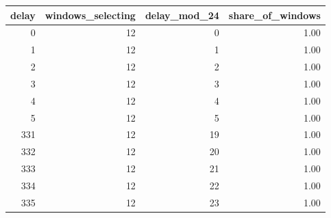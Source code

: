 \begin{tabular}{rrrr}
\toprule
delay & windows\_selecting & delay\_mod\_24 & share\_of\_windows \\
\midrule
0 & 12 & 0 & 1.00 \\
1 & 12 & 1 & 1.00 \\
2 & 12 & 2 & 1.00 \\
3 & 12 & 3 & 1.00 \\
4 & 12 & 4 & 1.00 \\
5 & 12 & 5 & 1.00 \\
331 & 12 & 19 & 1.00 \\
332 & 12 & 20 & 1.00 \\
333 & 12 & 21 & 1.00 \\
334 & 12 & 22 & 1.00 \\
335 & 12 & 23 & 1.00 \\
\bottomrule
\end{tabular}
